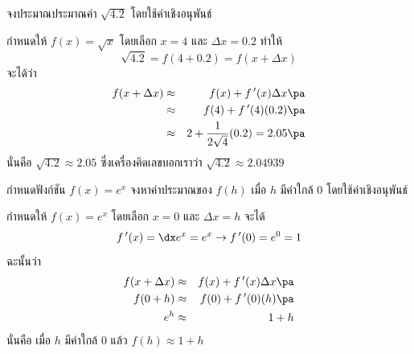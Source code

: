 \begin{frame}[t]
\begin{ex}
จงประมาณประมาณค่า  $\sqrt{4.2}$ โดยใช้ค่าเชิงอนุพันธ์
\end{ex}\pa
\begin{sol}
กำหนดให้ $f(x) = \sqrt{x}$ \pa โดยเลือก $x = 4$ และ $\Delta x = 0.2$ \pa ทำให้ 
\[\sqrt{4.2} = f(4+0.2) = f(x + \Delta x)\] \pa
จะได้ว่า 
\begin{eqnarray*}
f(x+\Delta x) &\approx& f(x) + f\,'(x) \Delta x \pa \\
&\approx& f(4) + f\,'(4) (0.2) \pa \\
&\approx& 2 + \frac{1}{2\sqrt{4}} (0.2) = 2.05 \pa
\end{eqnarray*}
นั่นคือ $\sqrt{4.2} \approx 2.05$ \pa ซึ่งเครื่องคิดเลขบอกเราว่า $\sqrt{4.2} \approx 2.04939$
\end{sol}
\end{frame}


\begin{frame}[t]
\begin{ex}
กำหนดฟังก์ชัน $f(x) = e^x$ จงหาค่าประมาณของ $f(h)$ เมื่อ $h$ มีค่าใกล้ $0$ โดยใช้ค่าเชิงอนุพันธ์
\end{ex}\pa
\begin{sol}
กำหนดให้ $f(x) = e^x $ \pa โดยเลือก $x = 0$ และ $\Delta x = h$ \pa จะได้
\[ f\,'(x) = \dx e^x = e^x  \rightarrow  f\,'(0) = e^0 = 1\]
ฉะนั้นว่า 
\begin{eqnarray*}
f(x+\Delta x) &\approx& f(x) + f\,'(x) \Delta x \pa \\
f(0+h)&\approx& f(0) + f\,'(0) (h) \pa \\
e^h &\approx& 1 + h
\end{eqnarray*}
นั่นคือ เมื่อ $h$ มีค่าใกล้ 0 แล้ว $f(h) \approx 1+h$
\end{sol}
\end{frame}